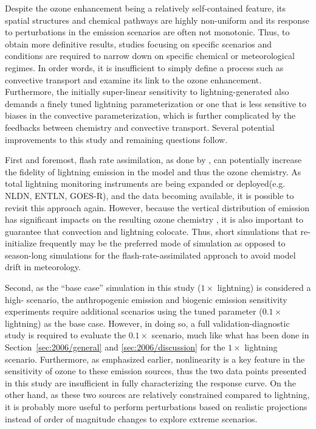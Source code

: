 Despite the ozone enhancement being a relatively self-contained feature, its spatial structures
and chemical pathways are highly non-uniform and its response to perturbations in the emission
scenarios are often not monotonic. Thus, to obtain more definitive results, studies
focusing on specific scenarios and conditions are required to narrow down on specific chemical
or meteorological regimes. In order words, it is insufficient to simply define a process such as
convective transport and examine its link to the ozone enhancement. Furthermore, the initially
super-linear sensitivity to lightning-generated  also demands a finely tuned lightning
parameterization or one that is less sensitive to biases in the convective parameterization, which
is further complicated by the feedbacks between chemistry and convective transport. Several
potential improvements to this study and remaining questions follow.

First and foremost, flash rate assimilation, as done by \citet{Cooper:2009nx}, can potentially
increase the fidelity of lightning  emission in the model and thus the ozone chemistry.
As total lightning monitoring instruments are being expanded or deployed(e.g. NLDN, ENTLN, GOES-R), and the
data becoming available, it is possible to revisit this approach again. However, because the vertical
distribution of {\lnox} emission has significant impacts on the resulting ozone chemistry
\citep{Pickering:1998sh}, it is also important to guarantee that convection and lightning colocate.
Thus, short simulations that re-initialize frequently may be the preferred mode of simulation as
opposed to season-long simulations for the flash-rate-assimilated approach to avoid model drift in meteorology.

Second, as the ``base case'' simulation in this study ($1\times$ lightning) is considered a high-{\lnox}
scenario, the anthropogenic emission and biogenic emission sensitivity experiments require
additional scenarios using the tuned parameter ($0.1\times$ lightning) as the base case. However,
in doing so, a full validation-diagnostic study is required to evaluate the $0.1\times$ scenario, much like
what has been done in Section~\ref{sec:2006/general} and \ref{sec:2006/discussion} for the $1\times$ lightning
scenario. Furthermore,  as emphasized earlier, nonlinearity is a key feature in the sensitivity of
ozone to these emission sources, thus the two data points presented in this study are insufficient in
fully characterizing the response curve. On the other hand, as these two sources are relatively
constrained compared to lightning, it is probably more useful to perform perturbations based on
realistic projections instead of order of magnitude changes to explore extreme scenarios.

